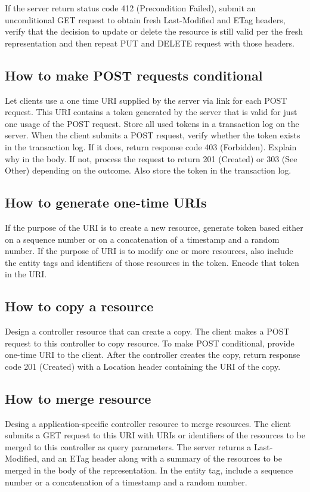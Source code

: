 \documentclass[11pt,a4paper]{article}
\begin{document}
If the server return status code 412 (Precondition Failed), submit an unconditional GET request to obtain fresh Last-Modified and ETag headers, verify that the decision to update or delete the resource is still valid per the fresh representation and then repeat PUT and DELETE request with those headers.

\subsection{How to make POST requests conditional}
Let clients use a one time URI supplied by the server via link for each POST request. This URI contains a token generated by the server that is valid for just one usage of the POST request. Store all used tokens in a transaction log on the server. When the client submits a POST request, verify whether the token exists in the transaction log. If it does, return response code 403 (Forbidden). Explain why in the body. If not, process the request to return 201 (Created) or 303 (See Other) depending on the outcome. Also store the token in the transaction log.

\subsection{How to generate one-time URIs}
If the purpose of the URI is to create a new resource, generate token based either on a sequence number or on a concatenation of a timestamp and a random number. If the purpose of URI is to modify one or more resources, also include the entity tags and identifiers of those resources in the token. Encode that token in the URI.

\subsection{How to copy a resource}
Design a controller resource that can create a copy. The client makes a POST request to this controller to copy resource. To make POST conditional, provide one-time URI to the client. After the controller creates the copy, return response code 201 (Created) with a Location header containing the URI of the copy.

\subsection{How to merge resource}
Desing a application-specific controller resource to merge resources. The client submits a GET request to this URI with URIs or identifiers of the resources to be merged to this controller as query parameters. The server returns a Last-Modified, and an ETag header along with a summary of the resources to be merged in the body of the representation. In the entity tag, include a sequence number or a concatenation of a timestamp and a random number. 
\end{document}
